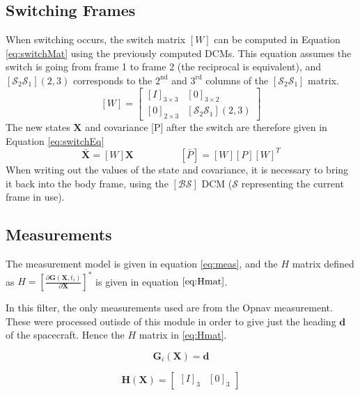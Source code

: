 \documentclass[]{BasiliskReportMemo}
\begin{document}
\subsection{Switching Frames} %

When switching occurs, the switch matrix $[W]$ can be computed in Equation \eqref{eq:switchMat} using the previously computed DCMs. This equation assumes the switch is going from frame 1 to frame 2 (the reciprocal is equivalent), and $[\mathcal{S}_2 \mathcal{S}_1](2,3)$ corresponds to the $2^{\text{nd}}$ and $3^{\text{rd}}$ columns of the $[\mathcal{S}_2 \mathcal{S}_1]$ matrix. 
\begin{equation}\label{eq:switchMat}
[W] = \begin{bmatrix} [I]_{3\times 3} & [0]_{3 \times 2} \\ [0]_{2 \times 3} & [\mathcal{S}_2 \mathcal{S}_1](2,3)\end{bmatrix}
\end{equation}
The new states $\bm X$ and covariance [P] after the switch are therefore given in Equation \eqref{eq:switchEq}
\begin{equation}\label{eq:switchEq}
\bar{\bm X} = [W] \bm X \hspace{2cm} [\bar{P}] = [W] [P] [W]^T
\end{equation}
When writing out the values of the state and covariance, it is necessary to bring it back into the body frame, using the $[\mathcal{B}\mathcal{S}]$ DCM ($\mathcal{S}$ representing the current frame in use).

\subsection{Measurements}
The measurement model is given in equation \ref{eq:meas}, and the $H$ matrix defined as $H = \left[\frac{\partial \bm G (\bm X, t_i)}{\partial \bm X}\right]^{*}$ is given in equation $\ref{eq:Hmat}$. 

In this filter, the only measurements used are from the Opnav measurement. These were processed outisde of this module in order to give just the heading $\bm d$ of the spacecraft. Hence the $H$ matrix in \eqref{eq:Hmat}. 

\begin{equation}\label{eq:meas}
\bm G_i(\bm X) = \bm d
\end{equation}

\begin{equation}\label{eq:Hmat}
\bm H(\bm X) = \begin{bmatrix} [I]_3 & [0]_3 \end{bmatrix} 
\end{equation}
\end{document}
